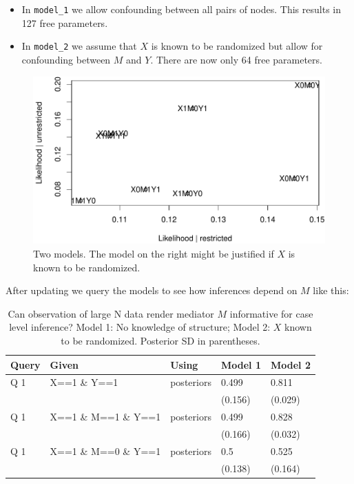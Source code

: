 \documentclass[
  12pt,
]{book}
\begin{document}
\begin{itemize}
\item
  In \texttt{model\_1} we allow confounding between all pairs of nodes. This results in 127 free parameters.
\item
  In \texttt{model\_2} we assume that \(X\) is known to be randomized but allow for confounding between \(M\) and \(Y\). There are now only 64 free parameters.
\end{itemize}

\begin{figure}
\centering
\includegraphics{ii_files/figure-latex/unnamed-chunk-39-1.pdf}
\caption{\label{fig:unnamed-chunk-39}Two models. The model on the right might be justified if \(X\) is known to be randomized.}
\end{figure}

After updating we query the models to see how inferences depend on \(M\) like this:

\begin{table}

\caption{\label{tab:unnamed-chunk-40}Can observation of large N data render mediator $M$ informative for case level inference? Model 1: No knowledge of structure; Model 2: $X$ known to be randomized. Posterior SD in parentheses.}
\centering
\begin{tabular}[t]{l|l|l|l|l}
\hline
Query & Given & Using & Model 1 & Model 2\\
\hline
Q 1 & X==1 \& Y==1 & posteriors & 0.499 & 0.811\\
\hline
 &  &  & (0.156) & (0.029)\\
\hline
Q 1 & X==1 \& M==1 \& Y==1 & posteriors & 0.499 & 0.828\\
\hline
 &  &  & (0.166) & (0.032)\\
\hline
Q 1 & X==1 \& M==0 \& Y==1 & posteriors & 0.5 & 0.525\\
\hline
 &  &  & (0.138) & (0.164)\\
\hline
\end{tabular}
\end{table}
\end{document}

